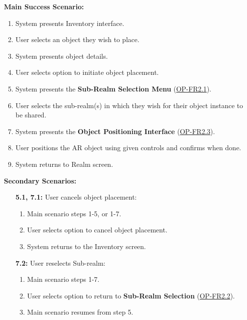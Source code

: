 \documentclass{article}
\begin{document}
\begin{enumerate}[label=\textbf{UC\arabic*}]
          \textbf{Main Success Scenario:}
          \begin{enumerate}[label=\textbf{\arabic*.}]
              \item System presents Inventory interface.
              \item User selects an object they wish to place.
              \item System presents object details.
              \item User selects option to initiate object placement.
              \item System presents the \textbf{Sub-Realm Selection Menu} (\hyperref[ssub:object_placement]{OP-FR2.1}).
              \item User selects the sub-realm(s) in which they wish for their object instance to be shared.
              \item System presents the \textbf{Object Positioning Interface} (\hyperref[ssub:object_placement]{OP-FR2.3}).
              \item User positions the AR object using given controls and confirms when done.
              \item System returns to Realm screen.
          \end{enumerate}

          \textbf{Secondary Scenarios:}
          \begin{itemize}
              \item[{\bf 5.1, 7.1:}] User cancels object placement:
                  \begin{enumerate}[label=\textbf{\arabic*.}]
                      \item Main scenario steps 1-5, or 1-7.
                      \item User selects option to cancel object placement.
                      \item System returns to the Inventory screen.
                  \end{enumerate}

              \item[{\bf 7.2:}] User reselects Sub-realm:
                  \begin{enumerate}[label=\textbf{\arabic*.}]
                      \item Main scenario steps 1-7.
                      \item User selects option to return to \textbf{Sub-Realm Selection} (\hyperref[ssub:object_placement]{OP-FR2.2}).
                      \item Main scenario resumes from step 5.
                  \end{enumerate}
          \end{itemize}


\end{enumerate}
\end{document}

